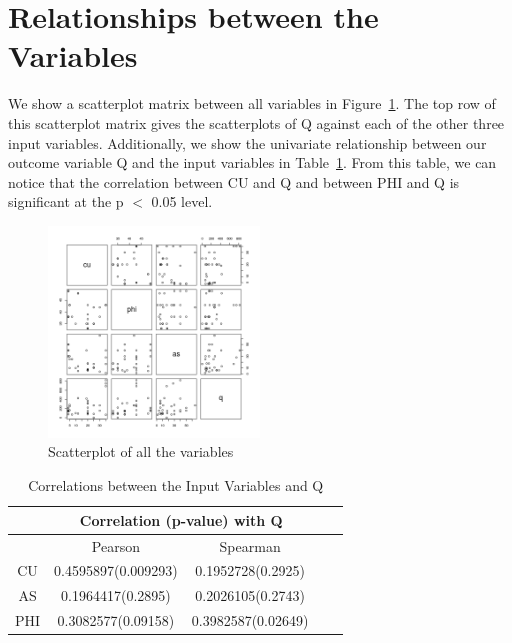 \documentclass[a4paper,12pt, english]{article}
\begin{document}
\section{Relationships between the Variables}
We show a scatterplot matrix between all variables in Figure~\ref{fig:pairs}. The top row of this scatterplot matrix gives the scatterplots of Q against each of the other three input variables. Additionally, we show the univariate relationship between our outcome variable Q and the input variables in Table~\ref{table:corr-q}. From this table, we can notice that the correlation between CU and Q and between PHI and Q is significant at the p $<$ 0.05 level.
\begin{figure}[H]
  \centering
  \includegraphics[width=0.5\textwidth]{pairs}
  \caption{Scatterplot of all the variables}
  \label{fig:pairs}
\end{figure}


\begin{table}[H]
\centering

\begin{tabular}{*5c}
\toprule
&  \multicolumn{2}{c}{Correlation (p-value) with Q} \\
\midrule
{}   & Pearson   & Spearman    \\
CU & 0.4595897(0.009293) & 0.1952728(0.2925)   \\
AS   & 0.1964417(0.2895)   & 0.2026105(0.2743)  \\
PHI & 0.3082577(0.09158)  & 0.3982587(0.02649)  \\
\bottomrule
\end{tabular}
\caption{Correlations between the Input Variables and Q}
\label{table:corr-q}
\end{table}
\end{document}
